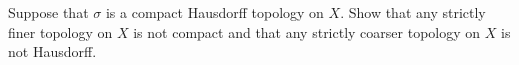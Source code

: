 Suppose that $\sigma$ is a compact Hausdorff topology on $X$. Show
that any strictly finer topology on $X$ is not compact and that any
strictly coarser topology on $X$ is not Hausdorff.

